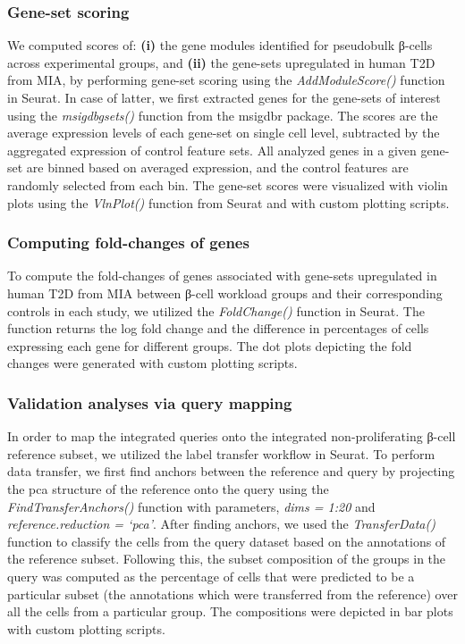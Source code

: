 \subsubsection{\large Gene-set scoring}
We computed scores of: \textbf{(i)} the gene modules identified for pseudobulk β-cells across experimental groups, and \textbf{(ii)} the gene-sets upregulated in human T2D from MIA, by performing gene-set scoring using the \textit{AddModuleScore()} function in Seurat. In case of latter, we first extracted genes for the gene-sets of interest using the \textit{msigdb\textunderscore gsets()} function from the msigdbr package. The scores are the average expression levels of each gene-set on single cell level, subtracted by the aggregated expression of control feature sets. All analyzed genes in a given gene-set are binned based on averaged expression, and the control features are randomly selected from each bin. The gene-set scores were visualized with violin plots using the \textit{VlnPlot()} function from Seurat and with custom plotting scripts.

\subsubsection{\large Computing fold-changes of genes}
To compute the fold-changes of genes associated with gene-sets upregulated in human T2D from MIA between β-cell workload groups and their corresponding controls in each study, we utilized the \textit{FoldChange()} function in Seurat. The function returns the log fold change and the difference in percentages of cells expressing each gene for different groups. The dot plots depicting the fold changes were generated with custom plotting scripts. 

\subsubsection{\large Validation analyses via query mapping}
In order to map the integrated queries onto the integrated non-proliferating β-cell reference subset, we utilized the label transfer workflow in Seurat. To perform data transfer, we first find anchors between the reference and query by projecting the \gls{pca} structure of the reference onto the query using the \textit{FindTransferAnchors()} function with parameters, \textit{dims = 1:20} and \textit{reference.reduction = `pca'}. After finding anchors, we used the \textit{TransferData()} function to classify the cells from the query dataset based on the annotations of the reference subset. Following this, the subset composition of the groups in the query was computed as the percentage of cells that were predicted to be a particular subset (the annotations which were transferred from the reference) over all the cells from a particular group. The compositions were depicted in bar plots with custom plotting scripts.